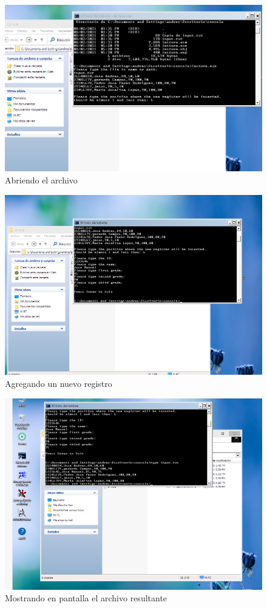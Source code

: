 \begin{figure}[H]
  \includegraphics[width=\linewidth]{practica5/img/fig1}
    \caption{Abriendo el archivo}
\end{figure}

\begin{figure}[H]
  \includegraphics[width=\linewidth]{practica5/img/fig2}
    \caption{Agregando un nuevo registro}
\end{figure}

\begin{figure}[H]
  \includegraphics[width=\linewidth]{practica5/img/fig3}
    \caption{Mostrando en pantalla el archivo resultante}
\end{figure}
